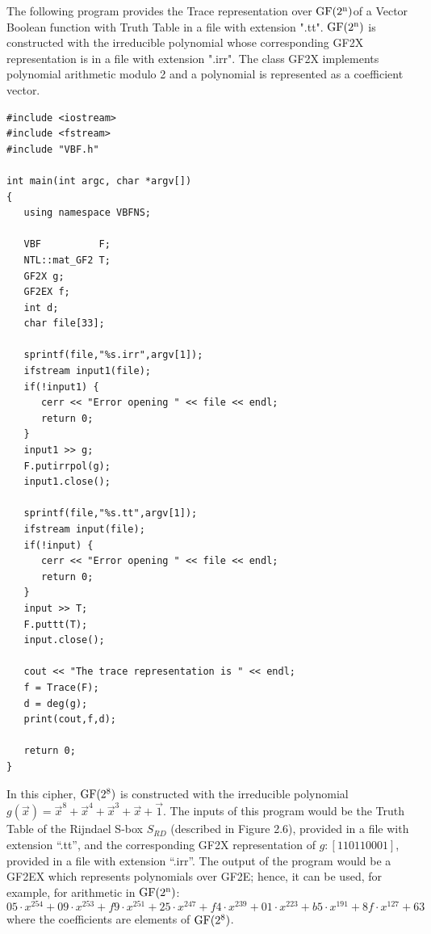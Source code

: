 \begin{example}
The following program provides the Trace representation over $\gf{GF(2^n)}$of a Vector Boolean function with Truth Table in a file with extension ".tt". $\gf{GF(2^n)}$ is constructed with the irreducible polynomial whose corresponding GF2X representation is in a file with extension ".irr". The class GF2X implements polynomial arithmetic modulo 2 and a polynomial is represented as a coefficient vector.

\begin{verbatim}
#include <iostream>
#include <fstream>
#include "VBF.h"

int main(int argc, char *argv[]) 
{
   using namespace VBFNS;

   VBF          F;
   NTL::mat_GF2 T;
   GF2X g;
   GF2EX f;
   int d;
   char file[33];

   sprintf(file,"%s.irr",argv[1]);
   ifstream input1(file);
   if(!input1) {
      cerr << "Error opening " << file << endl;
      return 0;
   }
   input1 >> g;
   F.putirrpol(g);
   input1.close();

   sprintf(file,"%s.tt",argv[1]);
   ifstream input(file);
   if(!input) {
      cerr << "Error opening " << file << endl;
      return 0;
   }
   input >> T;
   F.puttt(T);
   input.close();

   cout << "The trace representation is " << endl;
   f = Trace(F);
   d = deg(g);
   print(cout,f,d);

   return 0;
}
\end{verbatim}

In this cipher, $\gf{GF(2^8)}$ is constructed with the irreducible polynomial
$g(\vec{x}) = {\vec{x}}^8+{\vec{x}}^4+{\vec{x}}^3+\vec{x}+\vec{1}$. The inputs of this program would be the Truth Table of  the Rijndael S-box $S_{RD}$
(described in Figure 2.6), provided in a file with extension ``.tt'', and
the corresponding GF2X representation of $g: [1 1 0 1 1 0 0 0 1]$, provided in a file
with extension ``.irr''. The output of the program would be a GF2EX which
represents polynomials over GF2E; hence, it can be used, for example, for
arithmetic in $\gf{GF(2^n)}$:
\begin{equation}
05 \cdot x^{254} + 09 \cdot x^{253} + f9 \cdot x^{251} + 25 \cdot x^{247} + f4 \cdot x^{239} + 01 \cdot x^{223} + b5 \cdot x^{191} + 8f \cdot x^{127} + 63
\end{equation}
where the coefficients are elements of $\gf{GF(2^8)}$.

\end{example}


